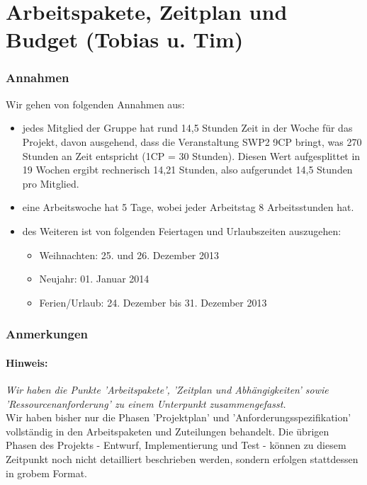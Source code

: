 \documentclass[fontsize=12pt,paper=a4,twoside]{scrartcl}
\begin{document}

\section{Arbeitspakete, Zeitplan und Budget (Tobias u. Tim)}

\subsubsection{Annahmen}\label{aps}

Wir gehen von folgenden Annahmen aus: \\
\begin{itemize}
\item jedes Mitglied der Gruppe hat rund 14,5 Stunden Zeit in der Woche für das Projekt, davon ausgehend, dass die Veranstaltung SWP2 9CP bringt, was 270 Stunden an Zeit entspricht (1CP = 30 Stunden). Diesen Wert aufgesplittet in 19 Wochen ergibt rechnerisch 14,21 Stunden, also aufgerundet 14,5 Stunden pro Mitglied.

\item eine Arbeitswoche hat 5 Tage, wobei jeder Arbeitstag 8 Arbeitsstunden hat.

\item des Weiteren ist von folgenden Feiertagen und Urlaubszeiten auszugehen:
\begin{itemize}
\item Weihnachten: 25. und 26. Dezember 2013
\item Neujahr: 01. Januar 2014
\item Ferien/Urlaub: 24. Dezember bis 31. Dezember 2013
\end{itemize}
\end{itemize}
\subsubsection{Anmerkungen}\label{aps}
\paragraph{Hinweis:} \textit{Wir haben die Punkte 'Arbeitspakete', 'Zeitplan und Abhängigkeiten' sowie 'Ressourcenanforderung' zu einem Unterpunkt zusammengefasst.}\\

Wir haben bisher nur die Phasen 'Projektplan' und 'Anforderungsspezifikation' vollständig in den Arbeitspaketen und Zuteilungen behandelt. Die übrigen Phasen des Projekts - Entwurf, Implementierung und Test - können zu diesem Zeitpunkt noch nicht detailliert beschrieben werden, sondern erfolgen stattdessen in grobem Format. \\
\end{document}
